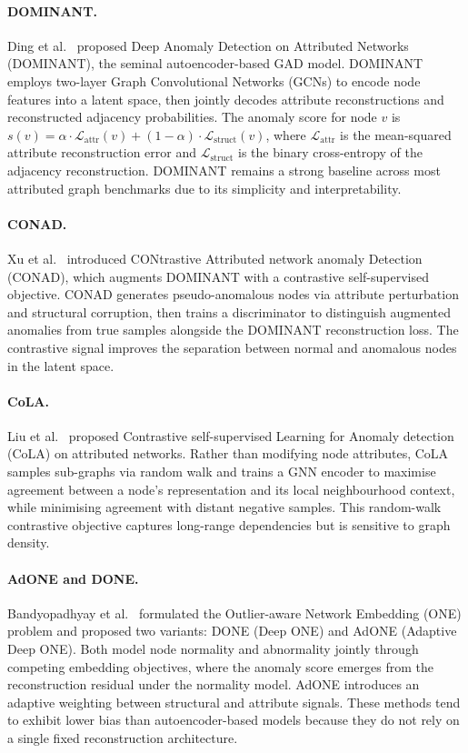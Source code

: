 \documentclass[sigconf,natbib=false]{acmart}
\begin{document}
\paragraph{DOMINANT.}
Ding et al.~\cite{ding2019dominant} proposed Deep Anomaly Detection on Attributed Networks (DOMINANT), the seminal autoencoder-based GAD model. DOMINANT employs two-layer Graph Convolutional Networks (GCNs) to encode node features into a latent space, then jointly decodes attribute reconstructions and reconstructed adjacency probabilities. The anomaly score for node $v$ is $s(v) = \alpha \cdot \mathcal{L}_\text{attr}(v) + (1-\alpha)\cdot \mathcal{L}_\text{struct}(v)$, where $\mathcal{L}_\text{attr}$ is the mean-squared attribute reconstruction error and $\mathcal{L}_\text{struct}$ is the binary cross-entropy of the adjacency reconstruction. DOMINANT remains a strong baseline across most attributed graph benchmarks due to its simplicity and interpretability.

\paragraph{CONAD.}
Xu et al.~\cite{xu2022conad} introduced CONtrastive Attributed network anomaly Detection (CONAD), which augments DOMINANT with a contrastive self-supervised objective. CONAD generates pseudo-anomalous nodes via attribute perturbation and structural corruption, then trains a discriminator to distinguish augmented anomalies from true samples alongside the DOMINANT reconstruction loss. The contrastive signal improves the separation between normal and anomalous nodes in the latent space.

\paragraph{CoLA.}
Liu et al.~\cite{liu2021anomaly} proposed Contrastive self-supervised Learning for Anomaly detection (CoLA) on attributed networks. Rather than modifying node attributes, CoLA samples sub-graphs via random walk and trains a GNN encoder to maximise agreement between a node's representation and its local neighbourhood context, while minimising agreement with distant negative samples. This random-walk contrastive objective captures long-range dependencies but is sensitive to graph density.

\paragraph{AdONE and DONE.}
Bandyopadhyay et al.~\cite{bandyopadhyay2020outlier} formulated the Outlier-aware Network Embedding (ONE) problem and proposed two variants: DONE (Deep ONE) and AdONE (Adaptive Deep ONE). Both model node normality and abnormality jointly through competing embedding objectives, where the anomaly score emerges from the reconstruction residual under the normality model. AdONE introduces an adaptive weighting between structural and attribute signals. These methods tend to exhibit lower bias than autoencoder-based models because they do not rely on a single fixed reconstruction architecture.
\end{document}
